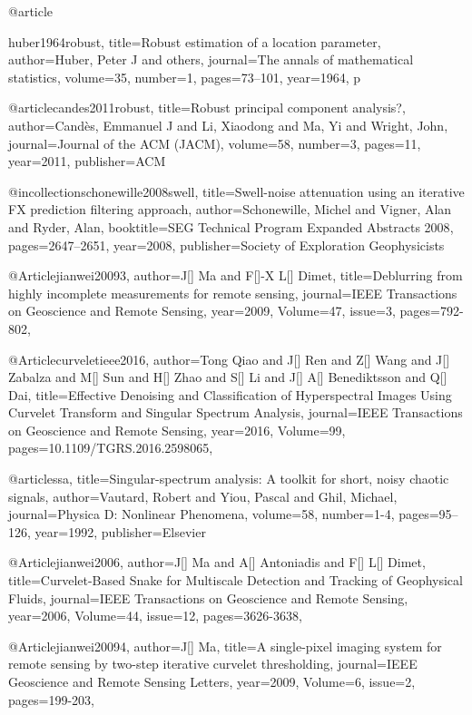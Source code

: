 @article{huber1964robust,
  title={Robust estimation of a location parameter},
  author={Huber, Peter J and others},
  journal={The annals of mathematical statistics},
  volume={35},
  number={1},
  pages={73--101},
  year={1964},
  p
  
  
@article{candes2011robust,
  title={Robust principal component analysis?},
  author={Cand{\`e}s, Emmanuel J and Li, Xiaodong and Ma, Yi and Wright, John},
  journal={Journal of the ACM (JACM)},
  volume={58},
  number={3},
  pages={11},
  year={2011},
  publisher={ACM}
}


@incollection{schonewille2008swell,
  title={Swell-noise attenuation using an iterative FX prediction filtering approach},
  author={Schonewille, Michel and Vigner, Alan and Ryder, Alan},
  booktitle={SEG Technical Program Expanded Abstracts 2008},
  pages={2647--2651},
  year={2008},
  publisher={Society of Exploration Geophysicists}
}

@Article{jianwei20093,
  author={J[] Ma and F[]-X L[] Dimet},
  title={Deblurring from highly incomplete measurements for remote sensing},
  journal={IEEE Transactions on Geoscience and Remote Sensing},
  year=2009,
  Volume=47,
  issue=3,
  pages={792-802},
}

@Article{curveletieee2016,
  author={Tong Qiao and J[] Ren and Z[] Wang and J[] Zabalza and M[] Sun and H[] Zhao and S[] Li and J[] A[] Benediktsson and Q[] Dai},
  title={Effective Denoising and Classification of Hyperspectral Images Using Curvelet Transform and Singular Spectrum Analysis},
  journal={IEEE Transactions on Geoscience and Remote Sensing},
  year=2016,
  Volume=99,
  pages={10.1109/TGRS.2016.2598065},
}

@article{ssa,
  title={Singular-spectrum analysis: A toolkit for short, noisy chaotic signals},
  author={Vautard, Robert and Yiou, Pascal and Ghil, Michael},
  journal={Physica D: Nonlinear Phenomena},
  volume={58},
  number={1-4},
  pages={95--126},
  year={1992},
  publisher={Elsevier}
}


@Article{jianwei2006,
  author={J[] Ma and A[] Antoniadis and F[] L[] Dimet},
  title={Curvelet-Based Snake for Multiscale Detection and Tracking of Geophysical Fluids},
  journal={IEEE Transactions on Geoscience and Remote Sensing},
  year=2006,
  Volume=44,
  issue=12,
  pages={3626-3638},
}

@Article{jianwei20094,
  author={J[] Ma},
  title={A single-pixel imaging system for remote sensing by two-step iterative curvelet
thresholding},
  journal={IEEE Geoscience and Remote Sensing Letters},
  year=2009,
  Volume=6,
  issue=2,
  pages={199-203},
}

}
